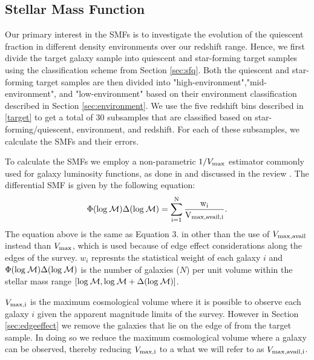 \documentclass{emulateapj}
\begin{document}
\subsection{Stellar Mass Function} \label{sec:smf_const}
Our primary interest in the SMFs is to investigate the evolution of the quiescent fraction in different density environments over our redshift range. 
Hence, we first divide the target galaxy sample into quiescent and star-forming target samples using the classification scheme from Section \ref{sec:sfq}.
Both the quiescent and star-forming target samples are then divided into "high-environment","mid-environment", and "low-environment" based on their environment classification described in 
Section \ref{sec:environment}.
We use the five redshift bins described in \ref{target} to get a total of $30$ subsamples that are classified based on star-forming/quiescent, environment, and redshift.
For each of these subsamples, we calculate the SMFs and their errors. 

To calculate the SMFs we employ a non-parametric $1/{V_{\rm{max}}}$ estimator commonly used for galaxy luminosity functions, as done in \cite{Moustakas:2013aa} and discussed 
in the review \cite{Johnston:2011aa}. 
The differential SMF is given by the following equation:
\begin{equation} \label{eq:phi}
\Phi(\rm{log}\: \mathcal{M}) \Delta(\rm{log} \:\mathcal{M}) = \sum\limits_{i=1}^{N} \frac{w_i}{V_{\rm{max,avail},i}}. 
\end{equation}
The equation above is the same as Equation 3. in \cite{Moustakas:2013aa} other than the use of $V_{\rm{max,avail}}$ instead than $V_{\rm{max}}$, which is used because of edge effect 
considerations along the edges of the survey. 
$w_i$ represnts the statistical weight of each galaxy $i$ and $\Phi(\rm{log}\: \mathcal{M}) \Delta(\rm{log}\: \mathcal{M})$ is the number of galaxies ($N$) per unit volume within the 
stellar mass range $[\rm{log} \:\mathcal{M}, \rm{log} \:\mathcal{M}+\Delta(\rm{log} \:\mathcal{M})]$.

$V_{\rm{max},i}$ is the maximum cosmological volume where it is possible to observe each galaxy $i$ given the apparent magnitude limits of the survey.
However in Section \ref{sec:edgeeffect} we remove the galaxies that lie on the edge of from the target sample. 
In doing so we reduce the maximum cosmological volume where a galaxy can be observed, thereby reducing $V_{\rm{max},i}$ to a what we will refer to as $V_{\rm{max,avail},i}$.
\end{document}
